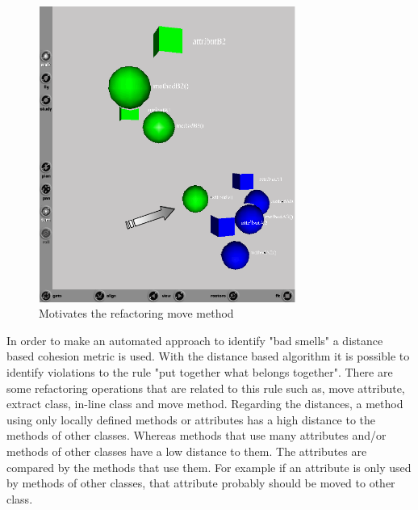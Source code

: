 \begin{figure}[h!]
  \centering
  \includegraphics[width=0.75\textwidth]{img/metricsbasedrefactoring.png}
  \caption{Motivates the refactoring move method}
  \label{fig:MetricsBasedRefactoring}
\end{figure}

In order to make an automated approach to identify "bad smells" a distance based cohesion metric is used.
With the distance based algorithm it is possible to identify violations to the rule "put together what belongs together". 
There are some refactoring operations that are related to this rule such as, move attribute, extract class, in-line class and move method. 
Regarding the distances, a method using only locally defined methods or attributes has a high distance to the methods of other classes. 
Whereas methods that use many attributes and/or methods of other classes have a low distance to them. 
The attributes are compared by the methods that use them. 
For example if an attribute is only used by methods of other classes, that attribute probably should be moved to other class.

